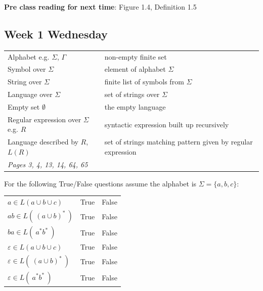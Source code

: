 \documentclass[12pt, oneside]{article}
\begin{document}
{\bf Pre class reading for next time}: Figure 1.4, Definition 1.5

\newpage
\subsection*{Week 1 Wednesday}

\begin{center}
    \begin{tabular}{|ll|}
    \hline
    Alphabet e.g. $\Sigma$, $\Gamma$ & 	non-empty finite set	 \\
    Symbol over $\Sigma$  & element of alphabet $\Sigma$\\
    String over $\Sigma$  &	finite list of symbols from $\Sigma$\\
    Language over $\Sigma$& set of strings over $\Sigma$ \\
    Empty set $\emptyset$ & the empty language\\
    Regular expression over $\Sigma$ e.g. $R$& syntactic expression built up recursively \\
    Language described by $R$,  $L(R)$ & set of strings matching pattern given by 
    regular expression\\
    \hline
    {\it Pages 3, 4, 13, 14, 64, 65}& \\
    \hline
    \end{tabular}
    \end{center}
    
    
    For the following True/False questions assume the alphabet is $\Sigma =  \{a,b,c\}$:
    
    \begin{center}
    \begin{tabular}{lcc}
    $a  \in L(a \cup b \cup c)$ & True & False \\
    $ab  \in L(~ (a \cup b)^*  ~)$ & True & False \\
    $ba \in L( ~ a^* b^* ~)$ & True & False \\
    $\varepsilon  \in L(a \cup b \cup c)$ & True & False \\
    $\varepsilon  \in L(~ (a \cup b)^*  ~)$ & True & False \\
    $\varepsilon \in L( ~ a^* b^* ~)$ & True & False \\
    \end{tabular}
    \end{center}
    
    
    
\end{document}
